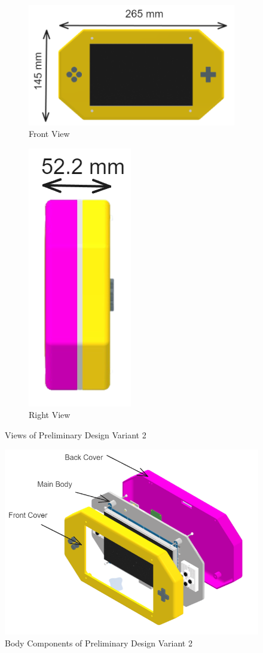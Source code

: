 \begin{figure}[ht!]
    \centering
    \begin{subfigure}[c]{0.65\textwidth}
        \begin{minipage}{\textwidth}
            \centering
            \includegraphics[height=4 cm]{texs/Part1/chapter4/image/v22.png}
        \end{minipage}
        \caption{Front View}
        \label{fig:variant2_front_view}
    \end{subfigure}
    \begin{subfigure}[c]{0.25\textwidth}
        \begin{minipage}{\textwidth}
            \centering
            \includegraphics[height=4 cm]{texs/Part1/chapter4/image/v23.png}
        \end{minipage}
        \caption{Right View}
        \label{fig:variant2_right_view}
    \end{subfigure}
    \caption{Views of Preliminary Design Variant 2}
    \label{fig:variant2_views}
\end{figure}

\begin{figure}[ht!]
    \centering
    \includegraphics[width=0.5\linewidth]{texs/Part1/chapter4/image/v24.png}
    \caption{Body Components of Preliminary Design Variant 2}
    \label{fig:variant2_body_components}
\end{figure}

